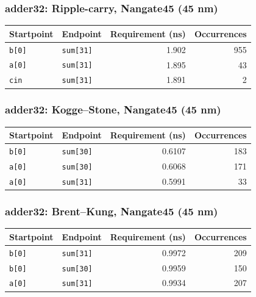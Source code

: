 \documentclass[10pt,letterpaper]{article}
\begin{document}
\subsubsection{adder32: Ripple-carry, Nangate45 (45 nm)}

\begin{tabularx}{\linewidth}{XXrr}\toprule Startpoint & Endpoint & Requirement (ns) & Occurrences \\ \midrule

\nolinkurl{b[0]} & \nolinkurl{sum[31]} & 1.902 & 955 \\

\nolinkurl{a[0]} & \nolinkurl{sum[31]} & 1.895 & 43 \\

\nolinkurl{cin} & \nolinkurl{sum[31]} & 1.891 & 2 \\

\bottomrule\end{tabularx}

\subsubsection{adder32: Kogge--Stone, Nangate45 (45 nm)}

\begin{tabularx}{\linewidth}{XXrr}\toprule Startpoint & Endpoint & Requirement (ns) & Occurrences \\ \midrule

\nolinkurl{b[0]} & \nolinkurl{sum[30]} & 0.6107 & 183 \\

\nolinkurl{a[0]} & \nolinkurl{sum[30]} & 0.6068 & 171 \\

\nolinkurl{a[0]} & \nolinkurl{sum[31]} & 0.5991 & 33 \\

\bottomrule\end{tabularx}

\subsubsection{adder32: Brent--Kung, Nangate45 (45 nm)}

\begin{tabularx}{\linewidth}{XXrr}\toprule Startpoint & Endpoint & Requirement (ns) & Occurrences \\ \midrule

\nolinkurl{b[0]} & \nolinkurl{sum[31]} & 0.9972 & 209 \\

\nolinkurl{b[0]} & \nolinkurl{sum[30]} & 0.9959 & 150 \\

\nolinkurl{a[0]} & \nolinkurl{sum[31]} & 0.9934 & 207 \\

\bottomrule\end{tabularx}
\end{document}
